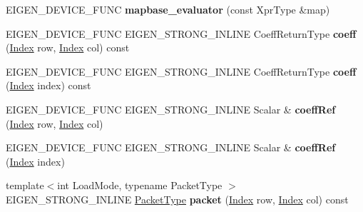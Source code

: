 \begin{DoxyCompactItemize}
E\+I\+G\+E\+N\+\_\+\+D\+E\+V\+I\+C\+E\+\_\+\+F\+U\+NC {\bfseries mapbase\+\_\+evaluator} (const Xpr\+Type \&map)
\item 
\mbox{\label{struct_eigen_1_1internal_1_1mapbase__evaluator_a4dbe712d8bdb561e02b1420abdcc6cdc}} 
E\+I\+G\+E\+N\+\_\+\+D\+E\+V\+I\+C\+E\+\_\+\+F\+U\+NC E\+I\+G\+E\+N\+\_\+\+S\+T\+R\+O\+N\+G\+\_\+\+I\+N\+L\+I\+NE Coeff\+Return\+Type {\bfseries coeff} (\hyperlink{namespace_eigen_a62e77e0933482dafde8fe197d9a2cfde}{Index} row, \hyperlink{namespace_eigen_a62e77e0933482dafde8fe197d9a2cfde}{Index} col) const
\item 
\mbox{\label{struct_eigen_1_1internal_1_1mapbase__evaluator_a36d8eb7d3a2e378aa1bfde1d353f5382}} 
E\+I\+G\+E\+N\+\_\+\+D\+E\+V\+I\+C\+E\+\_\+\+F\+U\+NC E\+I\+G\+E\+N\+\_\+\+S\+T\+R\+O\+N\+G\+\_\+\+I\+N\+L\+I\+NE Coeff\+Return\+Type {\bfseries coeff} (\hyperlink{namespace_eigen_a62e77e0933482dafde8fe197d9a2cfde}{Index} index) const
\item 
\mbox{\label{struct_eigen_1_1internal_1_1mapbase__evaluator_ac9694e32bc42a9bf79e048ead295107b}} 
E\+I\+G\+E\+N\+\_\+\+D\+E\+V\+I\+C\+E\+\_\+\+F\+U\+NC E\+I\+G\+E\+N\+\_\+\+S\+T\+R\+O\+N\+G\+\_\+\+I\+N\+L\+I\+NE Scalar \& {\bfseries coeff\+Ref} (\hyperlink{namespace_eigen_a62e77e0933482dafde8fe197d9a2cfde}{Index} row, \hyperlink{namespace_eigen_a62e77e0933482dafde8fe197d9a2cfde}{Index} col)
\item 
\mbox{\label{struct_eigen_1_1internal_1_1mapbase__evaluator_a62d6d58da26d33a14ed1a755acecd97d}} 
E\+I\+G\+E\+N\+\_\+\+D\+E\+V\+I\+C\+E\+\_\+\+F\+U\+NC E\+I\+G\+E\+N\+\_\+\+S\+T\+R\+O\+N\+G\+\_\+\+I\+N\+L\+I\+NE Scalar \& {\bfseries coeff\+Ref} (\hyperlink{namespace_eigen_a62e77e0933482dafde8fe197d9a2cfde}{Index} index)
\item 
\mbox{\label{struct_eigen_1_1internal_1_1mapbase__evaluator_afb33856cd493fbdffb2f57915dcd8888}} 
{\footnotesize template$<$int Load\+Mode, typename Packet\+Type $>$ }\\E\+I\+G\+E\+N\+\_\+\+S\+T\+R\+O\+N\+G\+\_\+\+I\+N\+L\+I\+NE \hyperlink{struct_eigen_1_1_packet_type}{Packet\+Type} {\bfseries packet} (\hyperlink{namespace_eigen_a62e77e0933482dafde8fe197d9a2cfde}{Index} row, \hyperlink{namespace_eigen_a62e77e0933482dafde8fe197d9a2cfde}{Index} col) const

\end{DoxyCompactItemize}
